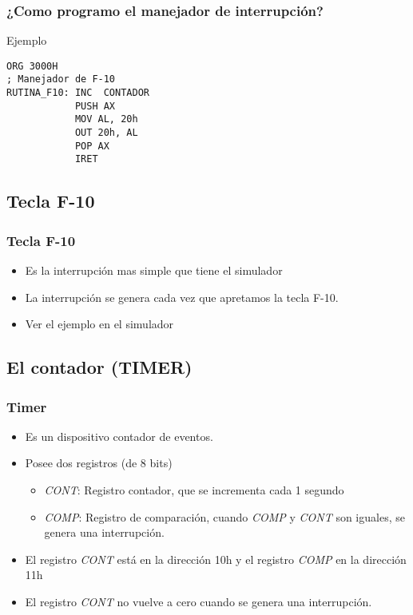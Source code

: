 \documentclass{beamer}
\begin{document}
\begin{frame}[fragile]
\frametitle{¿Como programo el manejador de interrupción?}
\begin{block}{Ejemplo}
\begin{verbatim}
ORG 3000H
; Manejador de F-10
RUTINA_F10: INC  CONTADOR
            PUSH AX
            MOV AL, 20h
            OUT 20h, AL
            POP AX
            IRET
\end{verbatim}
\end{block}

\end{frame}


\subsection{Tecla F-10}
\begin{frame}
\frametitle{Tecla F-10}
\begin{itemize}
 \item Es la interrupción mas simple que tiene el simulador
 \item La interrupción se genera cada vez que apretamos la tecla F-10.
 \item Ver el ejemplo en el simulador
\end{itemize}

\end{frame}

\subsection{El contador (TIMER)}
\begin{frame}
\frametitle{Timer}
\begin{itemize}
\item Es un dispositivo contador de eventos.
\item Posee dos registros (de 8 bits)
\begin{itemize}
 \item \emph{CONT}: Registro contador, que se incrementa cada 1 segundo
 \item \emph{COMP}: Registro de comparación, cuando \emph{COMP} y \emph{CONT} son iguales, se genera una interrupción.
\end{itemize}
\item El registro \emph{CONT} está en la dirección 10h y el registro \emph{COMP} en la dirección 11h
\item El registro \emph{CONT} no vuelve a cero cuando se genera una interrupción.
\end{itemize}

\end{frame}
\end{document}
